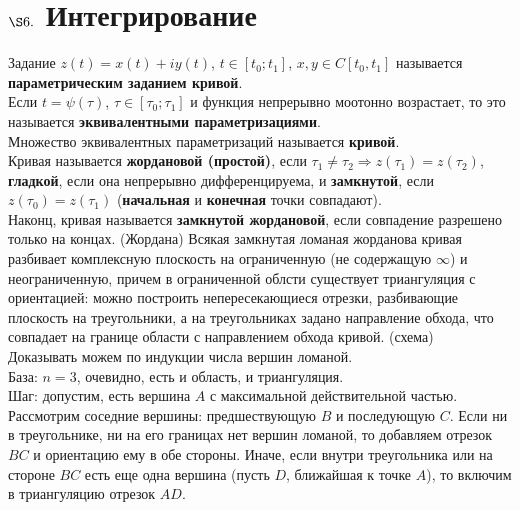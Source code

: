 \section{$\S 6.$ Интегрирование}
Задание $z(t) = x(t) + iy(t)$, $t \in [t_0;t_1]$, $x, y \in C[t_0, t_1]$
называется \textbf{параметрическим заданием кривой}.
\\
Если $t = \psi(\tau)$, $\tau \in [\tau_0; \tau_1]$ и функция непрерывно моотонно
возрастает, то это называется \textbf{эквивалентными параметризациями}.
\\
Множество эквивалентных параметризаций называется \textbf{кривой}.
\\
Кривая называется \textbf{жордановой (простой)}, если $\tau_1 \neq \tau_2
\Rightarrow z(\tau_1) = z(\tau_2)$, \textbf{гладкой}, если она непрерывно
дифференцируема, и \textbf{замкнутой}, если $z(\tau_0) = z(\tau_1)$
(\textbf{начальная} и \textbf{конечная} точки совпадают).
\\
Наконц, кривая называется \textbf{замкнутой жордановой}, если совпадение
разрешено только на концах.
\theorem (Жордана)
Всякая замкнутая ломаная жорданова кривая разбивает комплексную плоскость на
ограниченную (не содержащую $\infty$) и неограниченную, причем в ограниченной
облсти существует триангуляция с ориентацией: можно построить непересекающиеся
отрезки, разбивающие плоскость на треугольники, а на треугольниках задано
направление обхода, что совпадает на границе области с направлением обхода
кривой.
\pr (схема)
\\
Доказывать можем по индукции числа вершин ломаной.
\\
База: $n = 3$, очевидно, есть и область, и триангуляция.
\\
Шаг: допустим, есть вершина $A$ с максимальной действительной частью. Рассмотрим
соседние вершины: предшествующую $B$ и последующую $C$. Если ни в треугольнике,
ни на его границах нет вершин ломаной, то добавляем отрезок $BC$ и ориентацию
ему в обе стороны. Иначе, если внутри треугольника или на стороне $BC$ есть еще
одна вершина (пусть $D$, ближайшая к точке $A$), то включим в триангуляцию
отрезок $AD$.